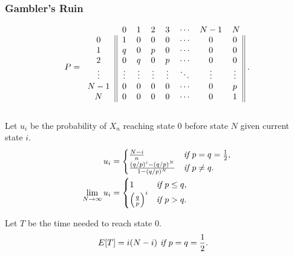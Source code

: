 \documentclass{article}
\begin{document}
\subsubsection{Gambler's Ruin}
\begin{align*}
    P = 
    \begin{blockarray}{cccccccc}
        & 0 & 1 & 2 & 3 & \cdots & N-1 & N \\
            \begin{block}{c||ccccccc||}
                0 & 1 & 0 & 0 & 0 & \cdots & 0 & 0 \\
                1 & q & 0 & p & 0 & \cdots & 0 & 0 \\
                2 & 0 & q & 0 & p & \cdots & 0 & 0 \\
                \vdots & \vdots & \vdots & \vdots & \vdots & \ddots & \vdots & \vdots\\
                N-1 & 0 & 0 & 0 & 0 & \cdots & 0 & p \\
                N & 0 & 0 & 0 & 0 & \cdots & 0 & 1 \\
            \end{block} 
        \end{blockarray}\; .
\end{align*}

Let $u_i$ be the probability of $X_n$ reaching state 0 before state $N$ given current state $i$.
\begin{align*}
    u_i & = \begin{cases}
        \frac{N-i}{n} & \emph{if } p = q = \frac{1}{2}, \\
        \frac{(q/p)^i-(q/p)^N}{1-(q/p)^N} & \emph{if } p \neq q.
    \end{cases} \\
    \lim_{N\rightarrow\infty} u_i & = \begin{cases}
        1 & \emph{if } p \le q, \\
        \left(\frac{q}{p}\right)^i & \emph{if } p > q.
    \end{cases}
\end{align*}

Let $T$ be the time needed to reach state 0.
\begin{align*}
    E[T] & = i(N-i) \emph{ if } p = q = \frac{1}{2}.
\end{align*}
\end{document}
